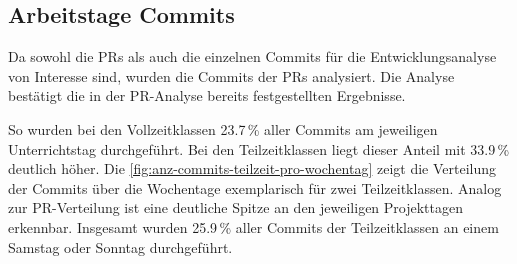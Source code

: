 \newpage
\subsection{Arbeitstage Commits}
Da sowohl die PRs als auch die einzelnen Commits für die Entwicklungsanalyse von Interesse sind, wurden die Commits der PRs analysiert.
Die Analyse bestätigt die in der PR-Analyse bereits festgestellten Ergebnisse.

So wurden bei den Vollzeitklassen 23.7\,\% aller Commits am jeweiligen Unterrichtstag durchgeführt. Bei den Teilzeitklassen liegt dieser Anteil mit 33.9\,\% deutlich höher. Die \autoref{fig:anz-commits-teilzeit-pro-wochentag} zeigt die Verteilung der Commits über die Wochentage exemplarisch für zwei Teilzeitklassen. Analog zur PR-Verteilung ist eine deutliche Spitze an den jeweiligen Projekttagen erkennbar. Insgesamt wurden 25.9\,\% aller Commits der Teilzeitklassen an einem Samstag oder Sonntag durchgeführt.


